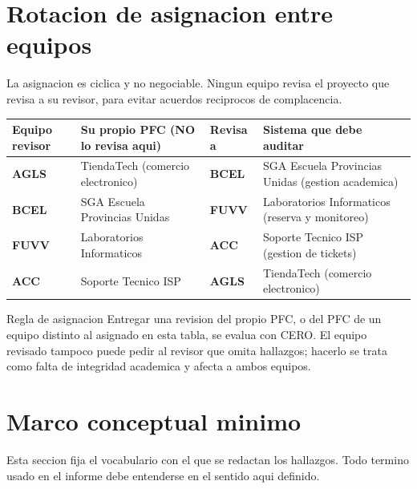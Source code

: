 \documentclass[11pt,a4paper]{article}
\begin{document}
\section{Rotacion de asignacion entre equipos}
\label{sec:rotacion}

La asignacion es ciclica y no negociable. Ningun equipo revisa el proyecto que revisa a su revisor, para evitar acuerdos reciprocos de complacencia.

\noindent
\begin{tabularx}{\linewidth}{@{}>{\bfseries}p{2.2cm} X >{\bfseries}p{2.4cm} X@{}}
    \toprule
    \rowcolor{uteqSoft}\textbf{\color{uteqBlue}Equipo revisor} & \textbf{\color{uteqBlue}Su propio PFC (NO lo revisa aqui)} & \textbf{\color{uteqBlue}Revisa a} & \textbf{\color{uteqBlue}Sistema que debe auditar} \\
    \midrule
    AGLS & TiendaTech (comercio electronico) & BCEL & SGA Escuela Provincias Unidas (gestion academica) \\
    BCEL & SGA Escuela Provincias Unidas & FUVV & Laboratorios Informaticos (reserva y monitoreo) \\
    FUVV & Laboratorios Informaticos & ACC & Soporte Tecnico ISP (gestion de tickets) \\
    ACC & Soporte Tecnico ISP & AGLS & TiendaTech (comercio electronico) \\
    \bottomrule
\end{tabularx}

\vspace{6pt}

\begin{pisoBox}{Regla de asignacion}
    Entregar una revision del propio PFC, o del PFC de un equipo distinto al asignado en esta tabla, se evalua con CERO. El equipo revisado tampoco puede pedir al revisor que omita hallazgos; hacerlo se trata como falta de integridad academica y afecta a ambos equipos.
\end{pisoBox}

\section{Marco conceptual minimo}

Esta seccion fija el vocabulario con el que se redactan los hallazgos. Todo termino usado en el informe debe entenderse en el sentido aqui definido.
\end{document}
